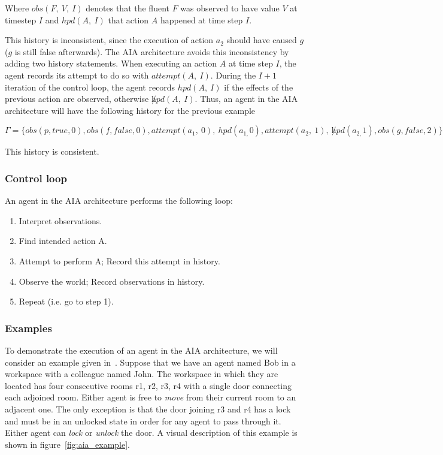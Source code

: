 Where $obs(F,\ V,\ I)$ denotes that the fluent $F$ was observed to have value $V$ at timestep $I$ and $hpd(A,\ I)$ that action $A$ happened at time step $I$.

This history is inconsistent, since the execution of action $a_2$ should have caused $g$ ($g$ is still false afterwards).
The AIA architecture avoids this inconsistency by adding two history statements.
When executing an action $A$ at time step $I$, the agent records its attempt to do so with $attempt(A,\ I)$.
During the $I+1$ iteration of the control loop, the agent records $hpd(A,\ I)$ if the effects of the previous action are observed, otherwise $\not hpd(A,\ I)$.
Thus, an agent in the AIA architecture will have the following history for the previous example

$$
\Gamma=\{obs\left(p,true,0\right),obs\left(f,false,0\right),attempt(a_1,\ 0),\ hpd\left(a_{1,}0\right),attempt(a_2,\ 1),\ \not hpd\left(a_{2,}1\right),obs\left(g,false,2\right)\}
$$

This history is consistent.

\subsubsection{Control loop}
\label{subsubsec:control_loop}

An agent in the AIA architecture performs the following loop:

\begin{enumerate}
    \item Interpret observations.
    \item Find intended action A.
    \item Attempt to perform A;
        Record this attempt in history.
    \item Observe the world;
        Record observations in history.
    \item Repeat (i.e. go to step 1).
\end{enumerate}

\subsubsection{Examples}
\label{subsubsec:aia_examples}

To demonstrate the execution of an agent in the AIA architecture, we will consider an example given in~\cite{blount_architecture_2013}.
Suppose that we have an agent named Bob in a workspace with a colleague named John.
The workspace in which they are located has four consecutive rooms r1, r2, r3, r4 with a single door connecting each adjoined room.
Either agent is free to \textit{move} from their current room to an adjacent one.
The only exception is that the door joining r3 and r4 has a lock and must be in an unlocked state in order for any agent to pass through it.
Either agent can \textit{lock} or \textit{unlock} the door.
A visual description of this example is shown in figure~\ref{fig:aia_example}.

